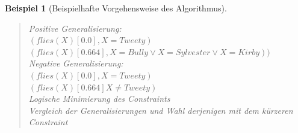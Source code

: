 \documentclass[a4paper, 11pt]{book}
\newtheorem{Bsp}{Beispiel}[section]
\begin{document}
\begin{Bsp}[Beispielhafte Vorgehensweise des Algorithmus]
\begin{enumerate}
\begin{quote}
			
			Positive Generalisierung:\\  
			$ (flies(X)[0.0], X=Tweety) $\\
			$ (flies(X)[0.664], X=Bully \lor  X=Sylvester \lor X=Kirby)) $\\
			Negative Generalisierung:\\  
			$ (flies(X)[0.0], X=Tweety) $\\
			$ (flies(X)[0.664] X \neq Tweety) $\\
			Logische Minimierung des Constraints\\
			Vergleich der Generalisierungen und Wahl derjenigen mit dem kürzeren Constraint\\
		\end{quote}
	\end{enumerate}
	
\end{Bsp}
\end{document}
